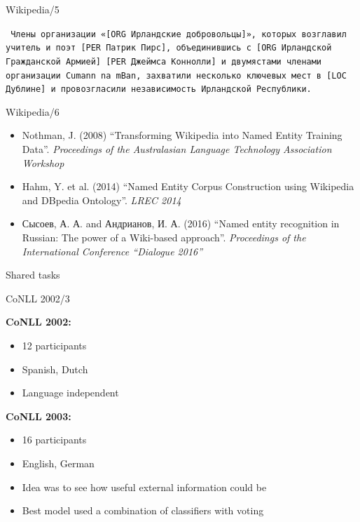 \documentclass[10pt, compress]{beamer}
\begin{document}
\begin{frame}{Wikipedia/5}

{\tt
Члены организации «[{\sc ORG} Ирландские добровольцы]», которых возглавил 
учитель и поэт [{\sc PER} Патрик Пирс], объединившись с [{\sc ORG} Ирландской 
Гражданской Армией] [{\sc PER} Джеймса Коннолли] и двумястами членами 
организации \alert<2>{Cumann na mBan}, захватили несколько ключевых мест 
в [{\sc LOC} Дублине] и провозгласили независимость \alert<2>{Ирландской Республики}.
}

\end{frame}

\begin{frame}{Wikipedia/6}

\begin{itemize}
  \item Nothman, J. (2008) ``Transforming Wikipedia into Named Entity Training Data''. \emph{Proceedings of the Australasian Language Technology Association Workshop}
  \item Hahm, Y. et al. (2014) ``Named Entity Corpus Construction using Wikipedia and DBpedia Ontology''. \emph{LREC 2014}
  \item Сысоев, А. А. and Андрианов, И. А. (2016) ``Named entity recognition in Russian: The power of a Wiki-based approach''. \emph{Proceedings of the International Conference “Dialogue 2016”}
\end{itemize}

\end{frame}



\begin{frame}[standout]
Shared tasks
\end{frame}

\begin{frame}{CoNLL 2002/3}

\textbf{CoNLL 2002:}
\begin{itemize}
\item 12 participants
\item Spanish, Dutch
\item Language independent
\end{itemize}

\textbf{CoNLL 2003:}
\begin{itemize}
\item 16 participants
\item English, German
\item Idea was to see how useful external information could be
\item Best model used a combination of classifiers with voting
\end{itemize}

\end{frame}
\end{document}
